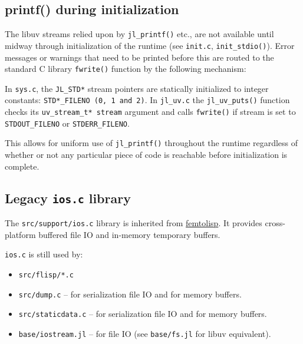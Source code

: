 \subsection{printf() during initialization}



The libuv streams relied upon by \texttt{jl\_printf()} etc., are not available until midway through initialization of the runtime (see \texttt{init.c}, \texttt{init\_stdio()}).  Error messages or warnings that need to be printed before this are routed to the standard C library \texttt{fwrite()} function by the following mechanism:



In \texttt{sys.c}, the \texttt{JL\_STD*} stream pointers are statically initialized to integer constants: \texttt{STD*\_FILENO (0, 1 and 2)}. In \texttt{jl\_uv.c} the \texttt{jl\_uv\_puts()} function checks its \texttt{uv\_stream\_t* stream} argument and calls \texttt{fwrite()} if stream is set to \texttt{STDOUT\_FILENO} or \texttt{STDERR\_FILENO}.



This allows for uniform use of \texttt{jl\_printf()} throughout the runtime regardless of whether or not any particular piece of code is reachable before initialization is complete.



\hypertarget{15654976823361224335}{}


\subsection{Legacy \texttt{ios.c} library}



The \texttt{src/support/ios.c} library is inherited from \href{https://github.com/JeffBezanson/femtolisp}{femtolisp}. It provides cross-platform buffered file IO and in-memory temporary buffers.



\texttt{ios.c} is still used by:



\begin{itemize}
\item \texttt{src/flisp/*.c}


\item \texttt{src/dump.c} – for serialization file IO and for memory buffers.


\item \texttt{src/staticdata.c} – for serialization file IO and for memory buffers.


\item \texttt{base/iostream.jl} – for file IO (see \texttt{base/fs.jl} for libuv equivalent).

\end{itemize}


